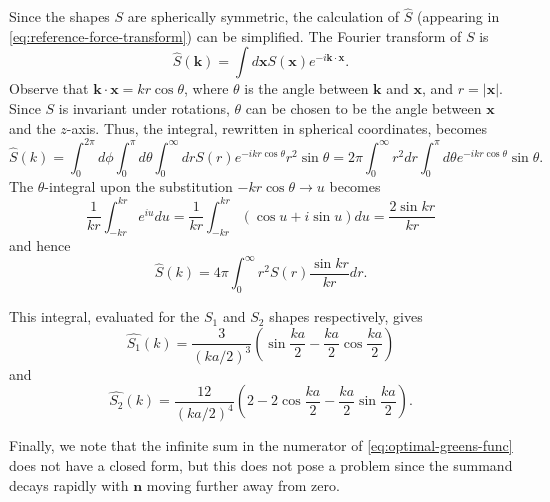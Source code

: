 Since the shapes $S$ are spherically symmetric, the calculation of $\hat{S}$ (appearing in \autoref{eq:reference-force-transform}) can be simplified.
The Fourier transform of $S$ is
\begin{equation*}
    \hat{S}(\mathbf{k}) = \int d\mathbf{x} S(\mathbf{x}) e^{-i\mathbf{k} \cdot \mathbf{x}}.
\end{equation*}
Observe that $\mathbf{k} \cdot \mathbf{x} = kr\cos\theta$, where $\theta$ is the angle between $\mathbf{k}$ and $\mathbf{x}$, and $r = |\mathbf{x}|$.
Since $S$ is invariant under rotations, $\theta$ can be chosen to be the angle between $\mathbf{x}$ and the $z$-axis.
Thus, the integral, rewritten in spherical coordinates, becomes
\begin{equation*}
    \hat{S}(k) = \int_{0}^{2\pi}d\phi \int_{0}^{\pi} d\theta \int_{0}^{\infty}dr S(r)e^{-ikr\cos\theta}r^2\sin\theta
    = 2\pi \int_{0}^{\infty} r^2 dr \int_{0}^{\pi} d\theta e^{-ikr\cos\theta} \sin\theta.
\end{equation*}
The $\theta$-integral upon the substitution $-kr\cos\theta \to u$ becomes
\begin{equation*}
    \frac{1}{kr}\int_{-kr}^{kr} e^{iu} du
    = \frac{1}{kr} \int_{-kr}^{kr} (\cos u + i \sin u) du
    = \frac{2\sin kr}{kr}
\end{equation*}
and hence
\begin{equation*}
    \hat{S}(k) = 4\pi \int_{0}^{\infty} r^2 S(r)\frac{\sin kr}{kr}dr.
\end{equation*}

This integral, evaluated for the $S_1$ and $S_2$ shapes respectively, gives
\begin{equation*}
    \hat{S_1}(k) = \frac{3}{(ka/2)^3} \left(\sin\frac{ka}{2} - \frac{ka}{2} \cos\frac{ka}{2}\right)
\end{equation*}
and
\begin{equation*}
    \hat{S_2}(k) = \frac{12}{(ka/2)^4}\left(2 - 2\cos\frac{ka}{2}-\frac{ka}{2}\sin\frac{ka}{2}\right).
\end{equation*}

Finally, we note that the infinite sum in the numerator of \autoref{eq:optimal-greens-func} does not have a closed form, but this does not pose a problem since the summand decays rapidly with $\mathbf{n}$ moving further away from zero.

